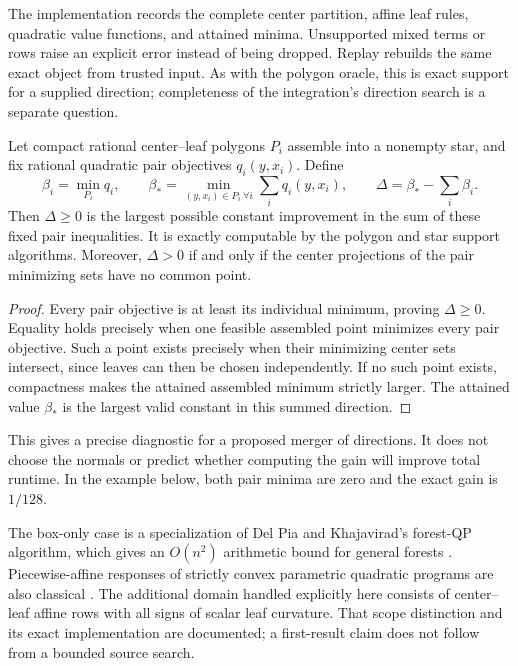 The implementation
records the complete center partition, affine leaf rules, quadratic
value functions, and attained minima. Unsupported mixed terms or rows
raise an explicit error instead of being dropped. Replay rebuilds the
same exact object from trusted input. As with the polygon oracle, this
is exact support for a supplied direction; completeness of the
integration's direction search is a separate question.

\begin{corollary}\label{cor:gain}
Let compact rational center--leaf polygons $P_i$ assemble into a nonempty
star, and fix rational quadratic pair objectives $q_i(y,x_i)$. Define
\[
\beta_i=\min_{P_i}q_i,\qquad
\beta_* = \min_{(y,x_i)\in P_i\ \forall i}\sum_iq_i(y,x_i),
\qquad \Delta=\beta_*-\sum_i\beta_i.
\]
Then $\Delta\ge0$ is the largest possible constant improvement in
the sum of these fixed pair inequalities. It is exactly computable by
the polygon and star support algorithms. Moreover, $\Delta>0$ if and
only if the center projections of the pair minimizing sets have no
common point.
\end{corollary}
\begin{proof}
Every pair objective is at least its individual minimum, proving
$\Delta\ge0$. Equality holds precisely when one feasible assembled
point minimizes every pair objective. Such a point exists precisely
when their minimizing center sets intersect, since leaves can then
be chosen independently. If no such point exists, compactness makes
the attained assembled minimum strictly larger. The attained value
$\beta_*$ is the largest valid constant in this summed direction.
\end{proof}

This gives a precise diagnostic for a proposed merger of directions.
It does not choose the normals or predict whether computing the gain
will improve total runtime. In the example below, both pair minima
are zero and the exact gain is $1/128$.

The box-only case is a specialization of Del Pia and Khajavirad's
forest-QP algorithm, which gives an $O(n^2)$ arithmetic bound for general
forests \cite{DelPiaKhajavirad2026}. Piecewise-affine responses of
strictly convex parametric quadratic programs are also classical
\cite{BemporadEtAl2002}. The additional domain handled explicitly here
consists of center--leaf affine rows with all signs of scalar leaf
curvature. That scope distinction and its exact implementation are
documented; a first-result claim does not follow from a bounded source
search.
